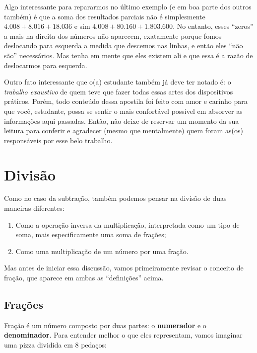 Algo interessante para repararmos no último exemplo (e em boa parte dos outros também) é que a soma dos resultados parciais não é simplesmente \(4.008+8.016+18.036\) e sim \(4.008+80.160+1.803.600\). No entanto, esses ``zeros'' a mais na direita dos números não aparecem, exatamente porque fomos deslocando para esquerda a medida que descemos nas linhas, e então eles ``não são'' necessários. Mas tenha em mente que eles existem ali e que essa é a razão de deslocarmos para esquerda.

Outro fato interessante que o(a) estudante também já deve ter notado é: o \textit{trabalho exaustivo} de quem teve que fazer todas essas artes dos dispositivos práticos. Porém, todo conteúdo dessa apostila foi feito com amor e carinho para que você, estudante, possa se sentir o mais confortável possível em absorver as informações aqui passadas. Então, não deixe de reservar um momento da sua leitura para conferir e agradecer (mesmo que mentalmente) quem foram as(os) responsáveis por esse belo trabalho.


\newpage
\section{Divisão}

Como no caso da subtração, também podemos pensar na divisão de duas maneiras diferentes:

\begin{enumerate}
    \item Como a operação inversa da multiplicação, interpretada como um tipo de soma, mais especificamente uma soma de frações;
    \item Como uma multiplicação de um número por uma fração.
\end{enumerate}

Mas antes de iniciar essa discussão, vamos primeiramente revisar o conceito de fração, que aparece em ambas as “definições” acima.

\subsection{Frações}
\label{fracoes}
Fração é um número composto por duas partes: o \textbf{numerador} e o \textbf{denominador}. Para entender melhor o que eles representam, vamos imaginar uma pizza dividida em 8 pedaços:

\begin{figure}[H]
    \centering
    
\end{figure}

